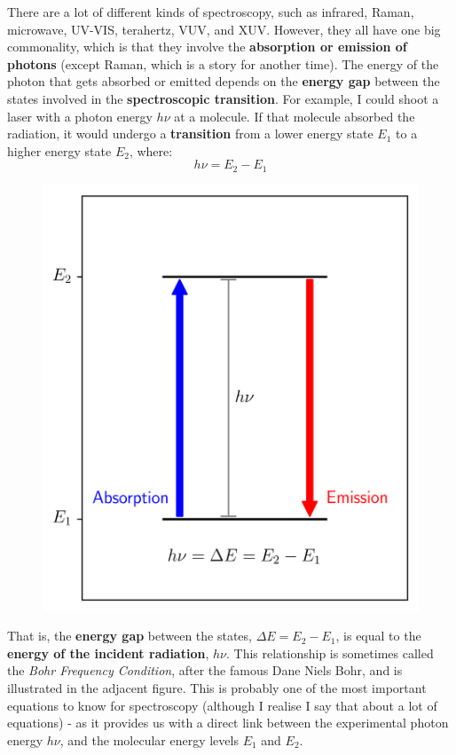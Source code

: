 \documentclass{memoir}[11pt,oneside,a4paper,openany]
\begin{document}
There are a lot of different kinds of spectroscopy, such as infrared, Raman, microwave, UV-VIS, terahertz, VUV, and XUV. However, they all have one big commonality, which is that they involve the \textbf{absorption or emission of photons} (except Raman, which is a story for another time). The energy of the photon that gets absorbed or emitted depends on the \textbf{energy gap} between the states involved in the \textbf{spectroscopic transition}. For example, I could shoot a laser with a photon energy $h\nu$ at a molecule. If that molecule absorbed the radiation, it would undergo a \textbf{transition} from a lower energy state $E_1$ to a higher energy state $E_2$, where:
\begin{equation}
	h\nu = E_2-E_1
\end{equation}
\begin{figure}
\centering
	\includegraphics[width=\linewidth]{energy_gap}
\end{figure}
That is, the \textbf{energy gap} between the states, $\Delta E = E_2 - E_1$, is equal to the \textbf{energy of the incident radiation}, $h\nu$. This relationship is sometimes called the \emph{Bohr Frequency Condition}, after the famous Dane Niels Bohr, and is illustrated in the adjacent figure. This is probably one of the most important equations to know for spectroscopy (although I realise I say that about a lot of equations) - as it provides us with a direct link between the experimental photon energy $h\nu$, and the molecular energy levels $E_1$ and $E_2$. 
\end{document}
